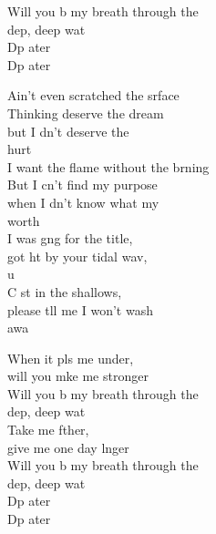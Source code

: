 \begin{cancion}
\begin{chorus}
	Will you b my breath through the \\
	dep, deep wat\\
	Dp ater    \\
	Dp ater    \\
	\end{chorus}%
	Ain't even scratched the srface\\
	Thinking  deserve the dream \\
	but I dn't deserve the \\
	hurt\\
	I want the flame without the brning\\
	But I cn't find my purpose \\
	when I dn't know what my \\
	worth \\
	I was gng for the title, \\
	got ht by your tidal wav, \\
	u\\
	C st in the shallows, \\
	please tll me I won't wash\\
	 awa  \\
	\begin{chorus}%
	When it pls me under, \\
	will you mke me stronger\\
	Will you b my breath through the \\
	dep, deep wat\\
	Take me fther, \\
	give me one day lnger\\
	Will you b my breath through the \\
	dep, deep wat\\
	Dp ater    \\
	Dp ater  \\

\end{chorus}
\end{cancion}
